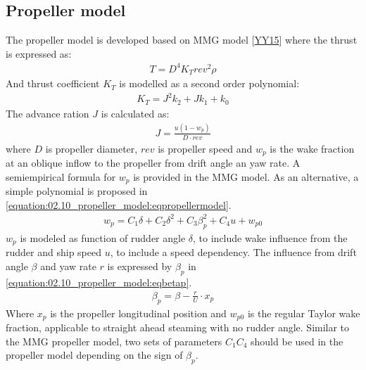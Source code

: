 \documentclass[review]{elsarticle}
\begin{document}
\subsection{Propeller model}
\label{\detokenize{02.10_propeller_model:propeller-model}}\label{\detokenize{02.10_propeller_model::doc}}
\sphinxAtStartPar
The propeller model is developed based on MMG model {[}\hyperlink{cite.bibligraphy:id22}{YY15}{]} where the thrust is expressed as:
\begin{equation}\label{equation:02.10_propeller_model:eqT}
\begin{split}\displaystyle T = D^{4} K_{T} rev^{2} \rho\end{split}
\end{equation}
\sphinxAtStartPar
And thrust coefficient \(K_T\) is modelled as a second order polynomial:
\begin{equation}\label{equation:02.10_propeller_model:eqkt}
\begin{split}\displaystyle K_{T} = J^{2} k_{2} + J k_{1} + k_{0}\end{split}
\end{equation}
\sphinxAtStartPar
The advance ration \(J\) is calculated as:
\begin{equation}\label{equation:02.10_propeller_model:eqJ}
\begin{split}\displaystyle J = \frac{u \left(1 - w_{p}\right)}{D \cdot rev}\end{split}
\end{equation}
\sphinxAtStartPar
where \(D\) is propeller diameter, \(rev\) is propeller speed and \(w_p\) is the wake fraction at an oblique inflow to the propeller from drift angle an yaw rate. A semi\sphinxhyphen{}empirical formula for \(w_p\) is provided in the MMG model. As an alternative, a simple polynomial is proposed in \autoref{equation:02.10_propeller_model:eqpropellermodel}.
\begin{equation}\label{equation:02.10_propeller_model:eqpropellermodel}
\begin{split}\displaystyle w_{p} = C_{1} \delta + C_{2} \delta^{2} + C_{3} \beta_{p}^{2} + C_{4} u + w_{p0}\end{split}
\end{equation}
\sphinxAtStartPar
\(w_p\) is modeled as function of rudder angle \(\delta\), to include wake influence from the rudder and ship speed \(u\), to include a speed dependency. The influence from drift angle \(\beta\) and yaw rate \(r\) is expressed by \(\beta_p\) in \autoref{equation:02.10_propeller_model:eqbetap}.
\begin{equation}\label{equation:02.10_propeller_model:eqbetap}
\begin{split}\beta_p=\beta - \frac{r}{U} \cdot x_p \end{split}
\end{equation}
\sphinxAtStartPar
Where \(x_p\) is the propeller longitudinal position and \(w_{p0}\) is the regular Taylor wake fraction, applicable to straight ahead steaming with no rudder angle. Similar to the MMG propeller model, two sets of parameters \(C_1\)\sphinxhyphen{}\(C_4\) should be used in the propeller model depending on the sign of \(\beta_p\).
\end{document}
